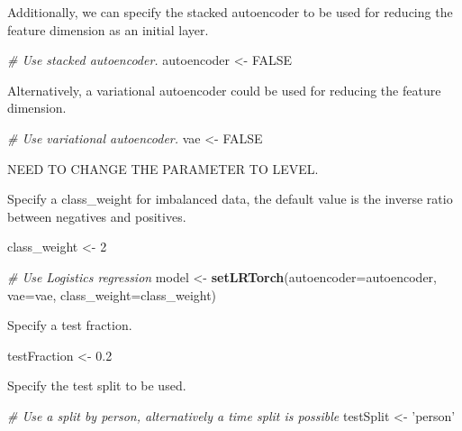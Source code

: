 \documentclass[]{article}
\newenvironment{Shaded}{\begin{snugshade}}{\end{snugshade}}
\newcommand{\KeywordTok}[1]{\textcolor[rgb]{0.13,0.29,0.53}{\textbf{#1}}}
\newcommand{\DataTypeTok}[1]{\textcolor[rgb]{0.13,0.29,0.53}{#1}}
\newcommand{\DecValTok}[1]{\textcolor[rgb]{0.00,0.00,0.81}{#1}}
\newcommand{\FloatTok}[1]{\textcolor[rgb]{0.00,0.00,0.81}{#1}}
\newcommand{\StringTok}[1]{\textcolor[rgb]{0.31,0.60,0.02}{#1}}
\newcommand{\CommentTok}[1]{\textcolor[rgb]{0.56,0.35,0.01}{\textit{#1}}}
\newcommand{\OtherTok}[1]{\textcolor[rgb]{0.56,0.35,0.01}{#1}}
\newcommand{\NormalTok}[1]{#1}
\begin{document}
Additionally, we can specify the stacked autoencoder to be used for
reducing the feature dimension as an initial layer.

\begin{Shaded}
\begin{Highlighting}[]
\CommentTok{# Use stacked autoencoder.}
\NormalTok{autoencoder <-}\StringTok{ }\OtherTok{FALSE}
\end{Highlighting}
\end{Shaded}

Alternatively, a variational autoencoder could be used for reducing the
feature dimension.

\begin{Shaded}
\begin{Highlighting}[]
\CommentTok{# Use variational autoencoder.}
\NormalTok{vae <-}\StringTok{ }\OtherTok{FALSE}
\end{Highlighting}
\end{Shaded}

NEED TO CHANGE THE PARAMETER TO LEVEL.

Specify a class\_weight for imbalanced data, the default value is the
inverse ratio between negatives and positives.

\begin{Shaded}
\begin{Highlighting}[]
\NormalTok{class_weight <-}\StringTok{ }\DecValTok{2}
\end{Highlighting}
\end{Shaded}

\begin{Shaded}
\begin{Highlighting}[]
\CommentTok{# Use Logistics regression}
\NormalTok{model <-}\StringTok{ }\KeywordTok{setLRTorch}\NormalTok{(}\DataTypeTok{autoencoder=}\NormalTok{autoencoder, }\DataTypeTok{vae=}\NormalTok{vae,  }\DataTypeTok{class_weight=}\NormalTok{class_weight)}
\end{Highlighting}
\end{Shaded}

Specify a test fraction.

\begin{Shaded}
\begin{Highlighting}[]
\NormalTok{testFraction <-}\StringTok{ }\FloatTok{0.2}
\end{Highlighting}
\end{Shaded}

Specify the test split to be used.

\begin{Shaded}
\begin{Highlighting}[]
\CommentTok{# Use a split by person, alternatively a time split is possible}
\NormalTok{testSplit <-}\StringTok{ 'person'}
\end{Highlighting}
\end{Shaded}
\end{document}
